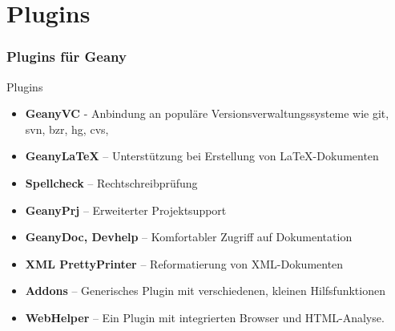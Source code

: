 \section{Plugins}

\begin{frame}
  \frametitle{Plugins für Geany}
  \begin{block}{Plugins}
    \begin{itemize}
    \item \textbf{GeanyVC} - Anbindung an populäre
        Versions\-ver\-waltungs\-systeme wie git, svn, bzr, hg, cvs,
    \item \textbf{GeanyLaTeX} -- Unterstützung bei Erstellung von
        \LaTeX-Dokumenten
    \item \textbf{Spellcheck} -- Rechtschreibprüfung
    \item \textbf{GeanyPrj} -- Erweiterter Projektsupport
    \item \textbf{GeanyDoc, Devhelp} -- Komfortabler Zugriff auf Dokumentation
    \item \textbf{XML PrettyPrinter} -- Reformatierung von XML-Dokumenten
    \item \textbf{Addons} -- Generisches Plugin mit verschiedenen,
          kleinen Hilfsfunktionen
    \item \textbf{WebHelper} -- Ein Plugin mit integrierten Browser
          und HTML-Analyse.
    \end{itemize}
  \end{block}
\end{frame}

